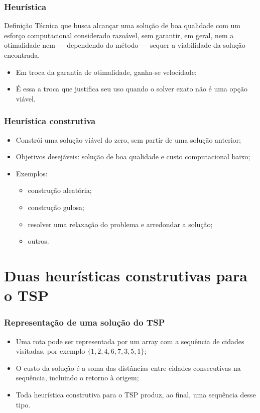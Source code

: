 \documentclass[fleqn]{beamer}
\begin{document}
\begin{frame}
	\frametitle{Heurística}
	\begin{block}{Definição}
		Técnica que busca alcançar uma solução de boa qualidade com um
		esforço computacional considerado razoável, sem garantir, em
		geral, nem a otimalidade nem — dependendo do método — sequer a
		viabilidade da solução encontrada.
	\end{block}
	\begin{itemize}
		\item Em troca da garantia de otimalidade, ganha-se velocidade;
		\item É essa a troca que justifica seu uso quando o solver exato
			não é uma opção viável.
	\end{itemize}
\end{frame}

\begin{frame}
	\frametitle{Heurística construtiva}
	\begin{itemize}
		\item Constrói uma solução viável do zero, sem partir de uma
			solução anterior;
		\item Objetivos desejáveis: solução de boa qualidade e custo
			computacional baixo;
		\item Exemplos:
		\begin{itemize}
			\item construção aleatória;
			\item construção gulosa;
			\item resolver uma relaxação do problema e arredondar a
				solução;
			\item outros.
		\end{itemize}
	\end{itemize}
\end{frame}

\section{Duas heurísticas construtivas para o TSP}

\begin{frame}
	\frametitle{Representação de uma solução do TSP}
	\begin{itemize}
		\item Uma rota pode ser representada por um array com a sequência
			de cidades visitadas, por exemplo $\{1, 2, 4, 6, 7, 3, 5, 1\}$;
		\item O custo da solução é a soma das distâncias entre cidades
			consecutivas na sequência, incluindo o retorno à origem;
		\item Toda heurística construtiva para o TSP produz, ao final, uma
			sequência desse tipo.
	\end{itemize}
\end{frame}
\end{document}
